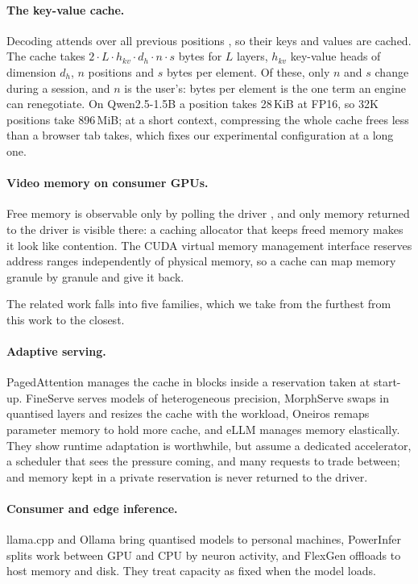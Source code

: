 \documentclass{article}
\begin{document}
\paragraph{The key-value cache.} Decoding attends over all previous positions
\cite{vaswani2017attention}, so their keys and values are cached. The cache
takes $2 \cdot L \cdot h_{kv} \cdot d_h \cdot n \cdot s$ bytes for $L$ layers,
$h_{kv}$ key-value heads of dimension $d_h$, $n$ positions and $s$ bytes per
element. Of these, only $n$ and $s$ change during a session, and $n$ is the
user's: bytes per element is the one term an engine can renegotiate. On
Qwen2.5-1.5B a position takes 28\,KiB at FP16, so 32K positions take 896\,MiB;
at a short context, compressing the whole cache frees less than a browser tab
takes, which fixes our experimental configuration at a long one.

\paragraph{Video memory on consumer GPUs.} Free memory is observable only by
polling the driver \cite{nvml}, and only memory returned to the driver is
visible there: a caching allocator that keeps freed memory makes it look like
contention. The CUDA virtual memory management interface \cite{cudavmm}
reserves address ranges independently of physical memory, so a cache can map
memory granule by granule and give it back.

The related work falls into five families, which we take from the furthest from
this work to the closest.

\paragraph{Adaptive serving.} PagedAttention \cite{kwon2023pagedattention}
manages the cache in blocks inside a reservation taken at start-up. FineServe
\cite{fineserve} serves models of heterogeneous precision, MorphServe
\cite{morphserve} swaps in quantised layers and resizes the cache with the
workload, Oneiros \cite{mirage} remaps parameter memory to hold more cache, and
eLLM \cite{ellm} manages memory elastically. They show runtime adaptation is
worthwhile, but assume a dedicated accelerator, a scheduler that sees the
pressure coming, and many requests to trade between; and memory kept in a
private reservation is never returned to the driver.

\paragraph{Consumer and edge inference.} llama.cpp \cite{llamacpp} and Ollama
\cite{ollama} bring quantised models to personal machines, PowerInfer
\cite{song2024powerinfer} splits work between GPU and CPU by neuron activity,
and FlexGen \cite{sheng2023flexgen} offloads to host memory and disk. They
treat capacity as fixed when the model loads.
\end{document}
